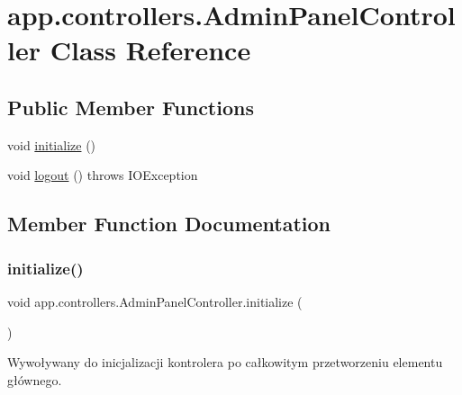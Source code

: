 \hypertarget{classapp_1_1controllers_1_1_admin_panel_controller}{}\section{app.\+controllers.\+Admin\+Panel\+Controller Class Reference}
\label{classapp_1_1controllers_1_1_admin_panel_controller}
\subsection*{Public Member Functions}
\begin{DoxyCompactItemize}
\item 
void \mbox{\hyperlink{classapp_1_1controllers_1_1_admin_panel_controller_a9d0445f32d15e5f9988793cf149a44c8}{initialize}} ()
\item 
void \mbox{\hyperlink{classapp_1_1controllers_1_1_admin_panel_controller_a3634b75893105486fe5c2e7261bdf646}{logout}} ()  throws I\+O\+Exception 
\end{DoxyCompactItemize}


\subsection{Member Function Documentation}
\mbox{\label{classapp_1_1controllers_1_1_admin_panel_controller_a9d0445f32d15e5f9988793cf149a44c8}} 
\subsubsection{\texorpdfstring{initialize()}{initialize()}}
{\footnotesize\ttfamily void app.\+controllers.\+Admin\+Panel\+Controller.\+initialize (\begin{DoxyParamCaption}{ }\end{DoxyParamCaption})}

Wywoływany do inicjalizacji kontrolera po całkowitym przetworzeniu elementu głównego. \mbox{\label{classapp_1_1controllers_1_1_admin_panel_controller_a3634b75893105486fe5c2e7261bdf646}} 
